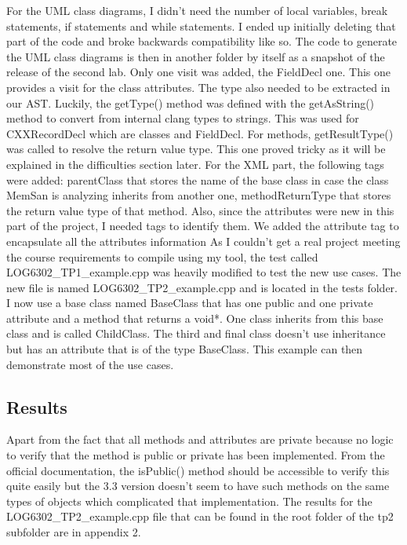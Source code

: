 \documentclass[conference,compsoc]{IEEEtran}
\begin{document}
 \par For the UML class diagrams, I didn't need
 the number of local variables, break statements, if statements
 and while statements. I ended up initially deleting that part of the code and broke backwards compatibility like so.
 The code to generate the UML class diagrams is then in another folder by itself as a snapshot of the release of the
 second lab.
 Only one
 visit was added, the FieldDecl one. This one provides a visit
 for the class attributes. The type also needed to be extracted
 in our AST. Luckily, the getType() method was defined with the
 getAsString() method to convert from internal clang types to strings.
 This was used for CXXRecordDecl which are classes and FieldDecl.
 For methods, getResultType() was called to resolve the return value type.
 This one proved tricky as it will be explained in the difficulties section later.
 For the XML part, the following tags were added: parentClass that stores the
 name of the base class in case the class MemSan is analyzing inherits from another one,
 methodReturnType that stores the return value type of that method. Also, since the
 attributes were new in this part of the project, I needed tags to identify them.
 We added the attribute tag to encapsulate all the attributes information
 As I couldn't get a real project meeting the course requirements to compile using my
 tool, the test called LOG6302\_TP1\_example.cpp was heavily modified to test the new use
 cases. The new file is named LOG6302\_TP2\_example.cpp and is located in the tests folder. 
 I now use a base class named BaseClass that has one public and one private
 attribute and a method that returns a void*. One class inherits from this base class
 and is called ChildClass. The third and final class doesn't use inheritance but
 has an attribute that is of the type BaseClass. This example can then demonstrate
 most of the use cases.

\subsection{Results}

 Apart from the fact that all methods and attributes are private because no logic
 to verify that the method is public or private has been implemented. From the official
 documentation, the isPublic() method should be accessible to verify this quite easily
 but the 3.3 version doesn't seem to have such methods on the same types of objects which
 complicated that implementation. The results for the LOG6302\_TP2\_example.cpp file that
 can be found in the root folder of the tp2 subfolder are in appendix 2.
\end{document}
